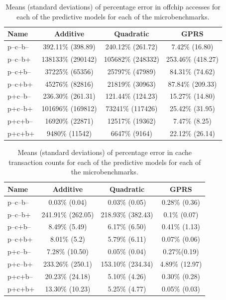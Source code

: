 \begin{table}
\scriptsize
\begin{tabular}{|l|c|c|c|}
\hline
Name & Additive & Quadratic & GPRS \\ \hline
  p--c--b-- & 392.11\% (398.89) &  240.12\% (261.72) & 7.42\% (16.80)  \\ \hline
 p--c--b+ &  138133\% (290142)&  105682\% (248332) &  253.46\% (418.27)  \\ \hline
 p--c+b-- &   37225\% (65356) &  25797\% (47989) & 84.31\% (74.62)  \\ \hline
 p--c+b+ &   45276\% (82816) &  21819\% (30963) &  87.84\% (209.33)  \\ \hline
 p+c--b-- & 236.30\% (261.31) &  121.44\% (124.23) & 15.27\% (14.80)    \\ \hline
 p+c--b+ &   101696\% (169812)  &  73241\% (117426) & 25.42\% (31.95) \\ \hline
 p+c+b--&  16920\% (22871)&   12517\% (19362) & 7.47\% (8.25)  \\ \hline
 p+c+b+&   9480\% (11542) &  6647\% (9164) &  22.12\% (26.14)  \\ \hline 
  \end{tabular}
 \caption{Means (standard deviations) of percentage error in offchip accesses for each of the predictive models for each of the microbenchmarks.}
\label{table:acc-offchip}
\end{table}
 
\begin{table}
\small
\begin{tabular}{|l|c|c|c|}
\hline
Name & Additive & Quadratic & GPRS \\ \hline
 p--c--b-- & 0.03\% (0.04) & 0.03\% (0.05) & 0.28\% (0.36) \\ \hline
 p--c--b+ & 241.91\% (262.05)  & 218.93\% (382.43) &  0.1\% (0.07) \\ \hline
 p--c+b-- & 8.49\% (5.49) & 6.17\% (6.50) & 0.41\% (1.13) \\ \hline
 p--c+b+ & 8.01\% (5.2)  & 5.79\% (6.11) & 0.07\% (0.06) \\ \hline
 p+c--b-- & 7.28\% (10.50)  & 0.05\% (0.04) & 0.27\%(0.19) \\ \hline
 p+c--b+ & 233.26\% (250.1) & 153.10\% (234.34) &  4.89\% (12.97)\\ \hline
 p+c+b-- & 20.23\% (24.18)  & 5.10\% (4.26) &  0.30\% (0.28) \\ \hline
 p+c+b+ & 13.30\% (10.23)  & 5.25\% (4.77)  & 0.05\% (0.03) \\ \hline 
  \end{tabular}
 \caption{Means (standard deviations) of percentage error in cache transaction counts for each of the predictive models for each of the microbenchmarks.}
\label{table:acc-cache}
\end{table}

